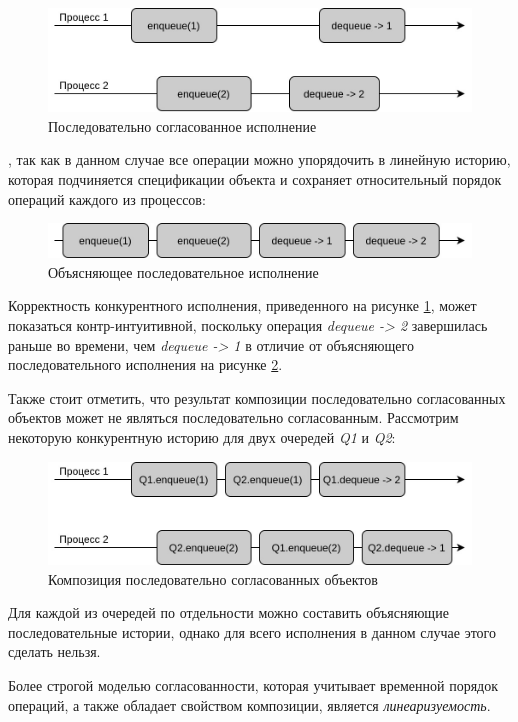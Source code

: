 \documentclass[14pt, openany]{book}
\begin{document}
\begin{figure}[h]
\caption{Последовательно согласованное исполнение}
\label{fig:sequential}
\vspace{2mm}
\centering
\includegraphics[scale=0.4]{Sequential.jpg}
\end{figure}
, так как в данном случае все операции можно упорядочить в линейную историю, которая подчиняется спецификации объекта и сохраняет относительный порядок операций каждого из процессов:
\begin{figure}[h]
\caption{Объясняющее последовательное исполнение}
\label{fig:sequentialExpl}
\vspace{2mm}
\centering
\includegraphics[scale=0.4]{SequentialExpl.jpg}
\end{figure}

Корректность конкурентного исполнения, приведенного на рисунке \ref{fig:sequential}, может показаться контр-интуитивной, поскольку операция \textit{dequeue -> 2} завершилась раньше во времени, чем \textit{dequeue -> 1} в отличие от объясняющего последовательного исполнения на рисунке \ref{fig:sequentialExpl}. \par
Также стоит отметить, что результат композиции последовательно согласованных объектов может не являться последовательно согласованным. Рассмотрим некоторую конкурентную историю для двух очередей \textit{Q1} и \textit{Q2}:

\begin{figure}[h]
\caption{Композиция последовательно согласованных объектов}
\vspace{2mm}
\centering
\includegraphics[scale=0.4]{SequentialComp.jpg}
\end{figure}
\noindent Для каждой из очередей по отдельности можно составить объясняющие последовательные истории, однако для всего исполнения в данном случае этого сделать нельзя. \par
Более строгой моделью согласованности, которая учитывает временной порядок операций, а также обладает свойством композиции, является \textit{линеаризуемость}. 
\end{document}
